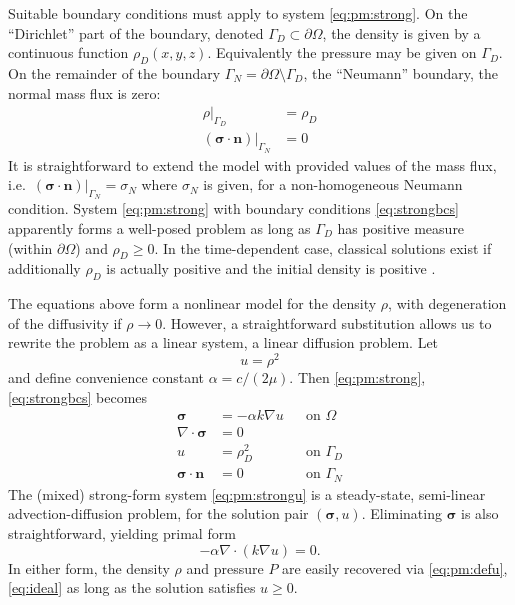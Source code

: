 \documentclass[11pt]{amsart}
\newcommand{\bn}{\mathbf{n}}
\newcommand{\bsigma}{\bm{\sigma}}
\newcommand{\Div}{\nabla\cdot}
\newcommand{\grad}{\nabla}
\begin{document}
Suitable boundary conditions must apply to system \eqref{eq:pm:strong}.  On the ``Dirichlet'' part of the boundary, denoted $\Gamma_D \subset \partial\Omega$, the density is given by a continuous function $\rho_D(x,y,z)$.  Equivalently the pressure may be given on $\Gamma_D$.  On the remainder of the boundary $\Gamma_N = \partial\Omega \setminus \Gamma_D$, the ``Neumann'' boundary, the normal mass flux is zero:
\begin{subequations}
\label{eq:strongbcs}
\begin{align}
\rho|_{\Gamma_D}               &= \rho_D \\
(\bsigma\cdot \bn)|_{\Gamma_N} &= 0
\end{align}
\end{subequations}
It is straightforward to extend the model with provided values of the mass flux, i.e.~$(\bsigma\cdot \bn)|_{\Gamma_N}= \sigma_N$ where $\sigma_N$ is given, for a non-homogeneous Neumann condition.  System \eqref{eq:pm:strong} with boundary conditions \eqref{eq:strongbcs} apparently forms a well-posed problem as long as $\Gamma_D$ has positive measure (within $\partial\Omega$) and $\rho_D\ge 0$.  In the time-dependent case, classical solutions exist if additionally $\rho_D$ is actually positive and the initial density is positive \citep[Theorem 3.1]{Vazquez2007}.

The equations above form a nonlinear model for the density $\rho$, with degeneration of the diffusivity if $\rho \to 0$.  However, a straightforward substitution allows us to rewrite the problem as a linear system, a linear diffusion problem.  Let
\begin{equation}
u = \rho^2 \label{eq:pm:defu}
\end{equation}
and define convenience constant $\alpha = c/(2\mu)$.  Then \eqref{eq:pm:strong}, \eqref{eq:strongbcs} becomes
\begin{subequations}
\label{eq:pm:strongu}
\begin{align}
\bsigma &= - \alpha k \grad u & &\text{on } \Omega \label{eq:pm:strongu:darcy} \\
\Div \bsigma &= 0 & & \label{eq:pm:strongu:masscont} \\
u &= \rho_D^2 & &\text{on } \Gamma_D  \label{eq:pm:strongu:bcD} \\
\bsigma\cdot \bn &= 0 & &\text{on } \Gamma_N  \label{eq:pm:strongu:bcN} 
\end{align}
\end{subequations}
The (mixed) strong-form system \eqref{eq:pm:strongu} is a steady-state, semi-linear advection-diffusion problem, for the solution pair $(\bsigma,u)$.  Eliminating $\bsigma$ is also straightforward, yielding primal form
\begin{equation}
-\alpha \Div(k\grad u) = 0. \label{eq:pm:primalstrongu}
\end{equation}
In either form, the density $\rho$ and pressure $P$ are easily recovered via \eqref{eq:pm:defu}, \eqref{eq:ideal} as long as the solution satisfies $u\ge 0$.
\end{document}
